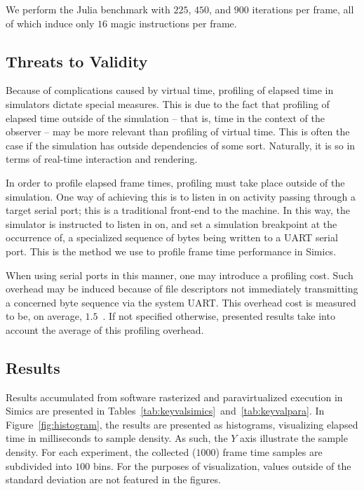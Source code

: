 We perform the Julia benchmark with $225$, $450$, and $900$ iterations per frame, all of which induce only $16$ magic instructions per frame.

\subsection{Threats to Validity}
\label{sec:threatstovalidity}
Because of complications caused by virtual time, profiling of elapsed time in simulators dictate special measures.
This is due to the fact that profiling of elapsed time outside of the simulation -- that is, time in the context of the observer -- may be more relevant than profiling of virtual time.
This is often the case if the simulation has outside dependencies of some sort.
Naturally, it is so in terms of real-time interaction and rendering.

In order to profile elapsed frame times, profiling must take place outside of the simulation.
One way of achieving this is to listen in on activity passing through a target serial port; this is a traditional front-end to the machine.
In this way, the simulator is instructed to listen in on, and set a simulation breakpoint at the occurrence of, a specialized sequence of bytes being written to a UART serial port.
This is the method we use to profile frame time performance in Simics.

When using serial ports in this manner, one may introduce a profiling cost.
Such overhead may be induced because of file descriptors not immediately transmitting a concerned byte sequence via the system UART.
This overhead cost is measured to be, on average, $1.5$~\milli\second .
If not specified otherwise, presented results take into account the average of this profiling overhead.

\subsection{Results}
\label{sec:results}
Results accumulated from software rasterized and paravirtualized execution in Simics are presented in Tables~\ref{tab:keyvalsimics}~and~\ref{tab:keyvalpara}.
In Figure~\ref{fig:histogram}, the results are presented as histograms, visualizing elapsed time in milliseconds to sample density.
As such, the $Y$ axis illustrate the sample density.
For each experiment, the collected ($1000$) frame time samples are subdivided into $100$ bins.
For the purposes of visualization, values outside of the standard deviation are not featured in the figures.

